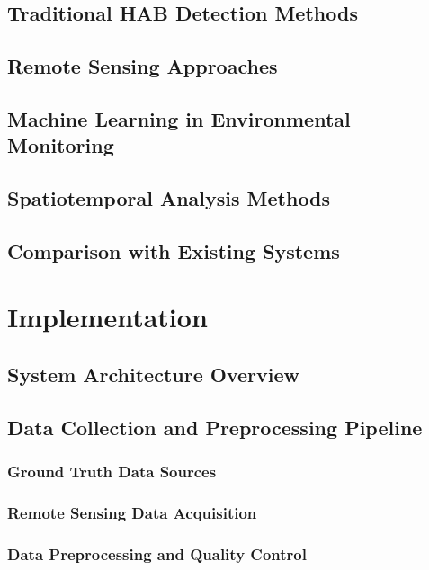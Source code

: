 \documentclass[conference]{IEEEtran}
\begin{document}
\subsection{Traditional HAB Detection Methods}

\subsection{Remote Sensing Approaches}

\subsection{Machine Learning in Environmental Monitoring}

\subsection{Spatiotemporal Analysis Methods}

\subsection{Comparison with Existing Systems}

\section{Implementation}

\subsection{System Architecture Overview}

\subsection{Data Collection and Preprocessing Pipeline}

\subsubsection{Ground Truth Data Sources}

\subsubsection{Remote Sensing Data Acquisition}

\subsubsection{Data Preprocessing and Quality Control}
\end{document}

